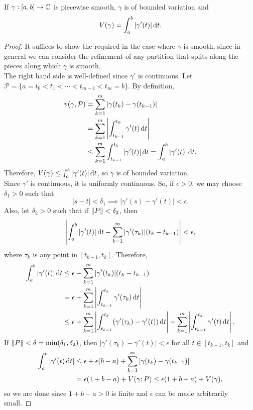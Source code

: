 		\begin{lemma}
			If $\gamma : [a,b] \to \mathbb{C}$ is piecewise smooth, $\gamma$ is of bounded variation and
			\[ V(\gamma) = \int_a^b |\gamma'(t)| \dif t. \]
		\end{lemma}
		\begin{proof}
			It suffices to show the required in the case where $\gamma$ is smooth, since in general we can consider the refinement of any partition that splits along the pieces along which $\gamma$ is smooth.\\
			The right hand side is well-defined since $\gamma'$ is continuous. Let $\mathcal{P} = \{ a = t_0 < t_1 < \cdots < t_{m-1} < t_m = b \}$. By definition,
			\begin{align*}
				v(\gamma,\mathcal{P}) &= \sum_{k=1}^m |\gamma(t_k) - \gamma(t_{k-1})| \\
					&= \sum_{k=1}^m \left| \int_{t_{k-1}}^{t_k} \gamma'(t) \dif t \right| \\
					&\le \sum_{k=1}^m \int_{t_{k-1}}^{t_k} |\gamma'(t)| \dif t = \int_a^b |\gamma'(t)| \dif t.
			\end{align*}
			Therefore, $V(\gamma) \le \int_a^b |\gamma'(t)| \dif t$, so $\gamma$ is of bounded variation.\\
			Since $\gamma'$ is continuous, it is uniformly continuous. So, if $\epsilon > 0$, we may choose $\delta_1 > 0$ such that
			\[ |s-t| < \delta_1 \implies |\gamma'(s) - \gamma'(t)| < \epsilon. \]
			Also, let $\delta_2 > 0$ such that if $\left\lVert P\right\rVert < \delta_2$, then
			\[ \left| \int_a^b |\gamma'(t)| \dif t - \sum_{k=1}^m |\gamma'(\tau_k)| (t_k - t_{k-1}) \right| < \epsilon, \]
			where $\tau_k$ is any point in $[t_{k-1},t_k]$. Therefore,
			\begin{align*}
				\int_a^b |\gamma'(t)| \dif t &\le \epsilon + \sum_{k=1}^{m} |\gamma'(t_k)| (t_k - t_{k-1}) \\
					&= \epsilon + \sum_{k=1}^m \left| \int_{t_{k-1}}^{t_k} \gamma'(\tau_k) \dif t \right| \\
					&\le \epsilon + \sum_{k=1}^m \left| \int_{t_{k-1}}^{t_k} (\gamma'(\tau_k) - \gamma'(t)) \dif t \right| + \sum_{k=1}^m \left| \int_{t_{k-1}}^{t_k} \gamma'(t) \dif t \right|.
			\end{align*}
			If $\left\lVert P\right\rVert < \delta = \min(\delta_1,\delta_2)$, then $|\gamma'(\tau_k) - \gamma'(t)| < \epsilon$ for all $t \in [t_{k-1},t_k]$ and
			\begin{align*}
				\int_a^b |\gamma'(t) \dif t| &\le \epsilon + \epsilon(b-a) + \sum_{k=1}^{m} |\gamma(t_k) - \gamma(t_{k-1})| \\
					&= \epsilon(1 + b-a) + V(\gamma;P) \le \epsilon(1 + b-a) + V(\gamma),
			\end{align*}
			so we are done since $1+b-a > 0$ is finite and $\epsilon$ can be made arbitrarily small.
		\end{proof}

